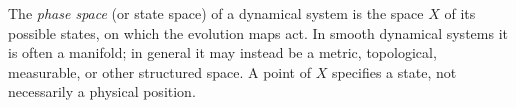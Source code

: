 
The \emph{phase space} (or state space) of a dynamical system is the space $X$ of its possible states, on which the evolution maps act. In smooth dynamical systems it is often a manifold; in general it may instead be a metric, topological, measurable, or other structured space. A point of $X$ specifies a state, not necessarily a physical position.
